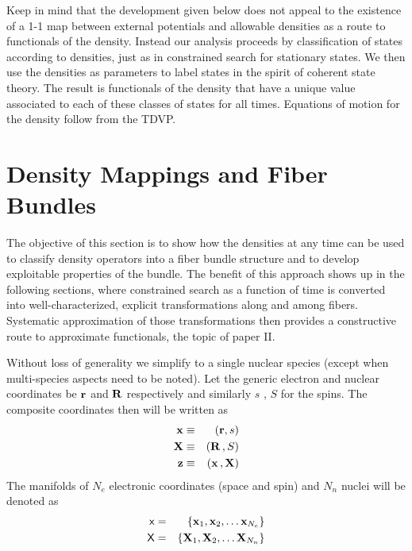 Keep in mind that the development given below does not appeal to the
existence of a 1-1 map between external potentials and allowable densities
as a route to functionals of the density. Instead our analysis proceeds by
classification of states according to densities, just as in constrained
search for stationary states. We then use the densities as parameters to
label states in the spirit of coherent state theory. The result is
functionals of the density that have a unique value associated to each of
these classes of states for all times. Equations of motion for the density
follow from the TDVP.\cite{KramSar}

\section{Density Mappings and Fiber Bundles}

\noindent The objective of this section is to show how the densities at any
time can be used to classify density operators into a fiber bundle structure
and to develop exploitable properties of the bundle. The benefit of this
approach shows up in the following sections, where constrained search as a
function of time is converted into well-characterized, explicit
transformations along and among fibers. Systematic approximation of those
transformations then provides a constructive route to approximate
functionals, the topic of paper II.

Without loss of generality we simplify to a single nuclear species (except
when multi-species aspects need to be noted). Let the generic electron and
nuclear coordinates be ${\bf r}$ and ${\bf R}$ respectively and similarly $s$%
, $S$ for the spins. The composite coordinates then will be written as 
\begin{eqnarray}
{\bf x} &\equiv &({\bf r},s)  \nonumber \\
{\bf X} &\equiv &({\bf R}\,,S)  \nonumber \\
{\bf z} &\equiv &({\bf x}\,,{\bf X})
\end{eqnarray}%
The manifolds of $N_{e}$ electronic coordinates (space and spin) and $N_{n}$
nuclei will be denoted as 
\begin{eqnarray}
{\sf x} &=&\{{\bf x}_{1},{\bf x}_{2},\ldots {\bf x}_{N_{e}}\}  \nonumber \\
{\sf X} &=&\{{\bf X}_{1},{\bf X}_{2},\ldots {\bf X}_{N_{n}}\}
\label{manifdef}
\end{eqnarray}


